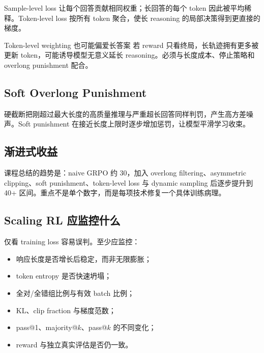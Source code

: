 \documentclass[a4paper]{article}
\begin{document}
Sample-level loss 让每个回答贡献相同权重；长回答的每个 token 因此被平均稀释。Token-level loss 按所有 token 聚合，使长 reasoning 的局部决策得到更直接的梯度。


\begin{warningbox}{Token-level weighting 也可能偏爱长答案}
若 reward 只看终局，长轨迹拥有更多被更新 token，可能诱导模型无意义延长 reasoning。必须与长度成本、停止策略和 overlong punishment 配合。
\end{warningbox}

\subsection{Soft Overlong Punishment}

硬截断把刚超过最大长度的高质量推理与严重超长回答同样判罚，产生高方差噪声。Soft punishment 在接近长度上限时逐步增加惩罚，让模型平滑学习收束。


\subsection{渐进式收益}


课程总结的趋势是：naive GRPO 约 30，加入 overlong filtering、asymmetric clipping、soft punishment、token-level loss 与 dynamic sampling 后逐步提升到 40+ 区间。重点不是单个数字，而是每项技术修复一个具体训练病理。

\subsection{Scaling RL 应监控什么}


仅看 training loss 容易误判。至少应监控：

\begin{itemize}
    \item 响应长度是否增长后稳定，而非无限膨胀；
    \item token entropy 是否快速坍塌；
    \item 全对/全错组比例与有效 batch 比例；
    \item KL、clip fraction 与梯度范数；
    \item pass@1、majority@$k$、pass@$k$ 的不同变化；
    \item reward 与独立真实评估是否仍一致。
\end{itemize}
\end{document}
